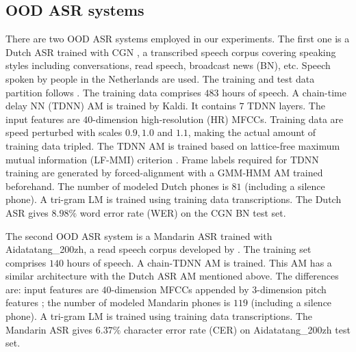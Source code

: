 \documentclass[a4paper]{article}
\begin{document}
\subsection{OOD ASR systems}
There are two OOD ASR systems employed in our experiments. The first one is a Dutch ASR trained with CGN \cite{oostdijk2000spoken}, a transcribed speech corpus covering  speaking styles including conversations, read speech, broadcast news (BN), etc.
Speech spoken by people in the Netherlands are used. The training and test data partition follows \cite{laurensw75cgn_kaldi}. The training data comprises $483$
 hours of speech. A chain-time delay NN (TDNN) AM \cite{povey2016purely} is trained by Kaldi. It contains $7$ TDNN layers. The input features are $40$-dimension high-resolution (HR) MFCCs. Training data are speed perturbed with scales $0.9, 1.0$ and $1.1$, making the actual  amount of training data tripled. The TDNN AM is trained based on lattice-free maximum mutual information (LF-MMI) criterion \cite{povey2016purely}. Frame labels required for TDNN training are generated by forced-alignment with a GMM-HMM AM trained beforehand. The number of modeled Dutch phones is $81$ (including a silence phone).
 A tri-gram LM is trained using training data transcriptions. 
The Dutch ASR gives $8.98\%$ word error rate (WER) on the CGN BN test set.

The second OOD ASR system is a Mandarin ASR trained with Aidatatang\_200zh, a read speech corpus developed by \cite{aidatatang}. The training set comprises $140$ hours of speech. A chain-TDNN AM is trained. This AM has a similar architecture with the Dutch ASR AM mentioned above. The differences are: input features are $40$-dimension MFCCs appended by $3$-dimension pitch features \cite{ghahremani2014pitch}; the number of modeled Mandarin phones is $119$ (including a silence phone). 
A tri-gram LM is trained using training data transcriptions.
The Mandarin ASR gives $6.37\%$ character error rate (CER) on Aidatatang\_200zh test set.


\end{document}
